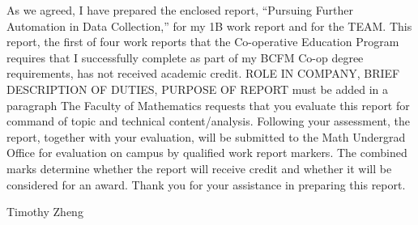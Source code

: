 \documentclass[12pt]{article}
\newcommand{\term}{1B } %
\newcommand{\WTT}{Pursuing Further Automation in Data Collection}
\begin{document}




\FirstPage

\newpage




\LetterHead



As we agreed, I have prepared the enclosed report, “\WTT,” for
my \term work report and for the TEAM. This
report, the first of four work reports that the Co-operative Education Program
requires that I successfully complete as part of my BCFM Co-op degree
requirements, has not received academic credit.
\vskip 10pt
ROLE IN COMPANY, BRIEF DESCRIPTION OF DUTIES, PURPOSE OF REPORT must be added in a paragraph
\vskip 10pt 
The Faculty of Mathematics requests that you evaluate this report for command
of topic and technical content/analysis. Following your assessment, the report,
together with your evaluation, will be submitted to the Math Undergrad Office
for evaluation on campus by qualified work report markers. The combined
marks determine whether the report will receive credit and whether it will be
considered for an award.
\vskip 10pt 
Thank you for your assistance in preparing this report.

Timothy Zheng






\toc 






\end{document}
